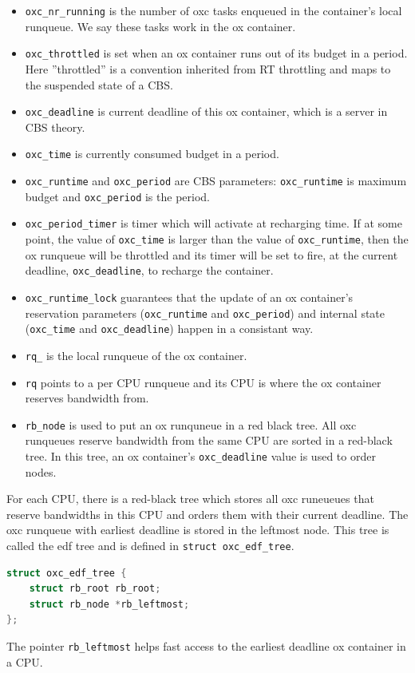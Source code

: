 \begin{itemize}
\item \texttt{oxc\_nr\_running} is the number of oxc tasks enqueued in 
		the container's local runqueue. We say these tasks work 
		in the ox container.
\item \texttt{oxc\_throttled} is set when an ox container runs out of
		its budget in a period.	Here ''throttled'' is a 
		convention inherited from RT throttling and 
		maps to the suspended state of a CBS. 
\item \texttt{oxc\_deadline} is current deadline of this ox container,
		which is a server in CBS theory.
\item \texttt{oxc\_time} is currently consumed budget in a period.
\item \texttt{oxc\_runtime} and \texttt{oxc\_period} are CBS parameters:
		\texttt{oxc\_runtime} is maximum budget and 
		\texttt{oxc\_period} is the period.
\item \texttt{oxc\_period\_timer} is timer which will activate at recharging
		time. If at some point, the value of \texttt{oxc\_time} is 
		larger than the value of \texttt{oxc\_runtime}, then
		the ox runqueue will be throttled and 
		its timer will be set to fire, at the 
		current deadline, \texttt{oxc\_deadline}, 
		to recharge the container.
\item \texttt{oxc\_runtime\_lock} guarantees that the update of an ox 
		container's reservation parameters (\texttt{oxc\_runtime} 
		and \texttt{oxc\_period}) and internal state 
		(\texttt{oxc\_time} and \texttt{oxc\_deadline}) happen
		in a consistant way.
\item \texttt{rq\_} is the local runqueue of the ox container.
\item \texttt{rq} points to a per CPU runqueue and its CPU is where the 
		ox container reserves bandwidth from.
\item \texttt{rb\_node} is used to put an ox runquneue in a red black tree.
		All oxc runqueues reserve bandwidth from the same CPU
		are sorted in a red-black tree. In this tree, an ox 
		container's \texttt{oxc\_deadline} value is used to order 
		nodes.
\end{itemize}
For each CPU, there is a red-black tree which stores all oxc runeueues that
reserve bandwidths in this CPU and orders them with their current deadline.
The oxc runqueue with earliest deadline is stored in the leftmost node. 
This tree is called the edf tree and is defined in 
\texttt{struct oxc\_edf\_tree}.

\begin{lstlisting}[language=C, caption={The EDF tree}]
struct oxc_edf_tree {
	struct rb_root rb_root;
	struct rb_node *rb_leftmost;
};
\end{lstlisting}
The pointer \texttt{rb\_leftmost} helps fast access to the earliest deadline
ox container in a CPU.

